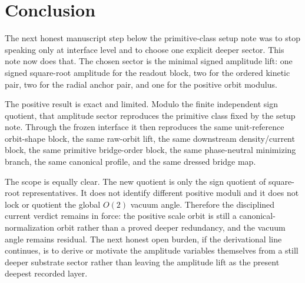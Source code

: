 \documentclass[11pt]{article}
\begin{document}
\section{Conclusion}

The next honest manuscript step below the primitive-class setup note was to stop speaking only at interface level and to choose one explicit deeper sector. This note now does that. The chosen sector is the minimal signed amplitude lift: one signed square-root amplitude for the readout block, two for the ordered kinetic pair, two for the radial anchor pair, and one for the positive orbit modulus.

The positive result is exact and limited. Modulo the finite independent sign quotient, that amplitude sector reproduces the primitive class fixed by the setup note. Through the frozen interface it then reproduces the same unit-reference orbit-shape block, the same raw-orbit lift, the same downstream density/current block, the same primitive bridge-order block, the same phase-neutral minimizing branch, the same canonical profile, and the same dressed bridge map.

The scope is equally clear. The new quotient is only the sign quotient of square-root representatives. It does not identify different positive moduli and it does not lock or quotient the global \(O(2)\) vacuum angle. Therefore the disciplined current verdict remains in force: the positive scale orbit is still a canonical-normalization orbit rather than a proved deeper redundancy, and the vacuum angle remains residual. The next honest open burden, if the derivational line continues, is to derive or motivate the amplitude variables themselves from a still deeper substrate sector rather than leaving the amplitude lift as the present deepest recorded layer.
\end{document}
